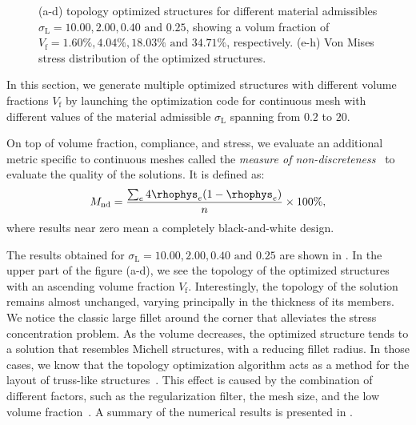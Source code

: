 \begin{figure}[]
    \hfill
    \hfill
    \caption{(a-d) topology optimized structures for different material admissibles $\sigma_\text{L}=10.00,2.00,0.40\text{ and }0.25$, showing a volum fraction of $V_\text{f}=1.60\%,4.04\%,18.03\%\text{ and }34.71\%$, respectively. (e-h) Von Mises stress distribution of the optimized structures.}
    \label{fig:03_to_sol}
\end{figure}
In this section, we generate multiple optimized structures with different volume fractions $V_\text{f}$ by launching the optimization code for continuous mesh with different values of the material admissible $\sigma_\text{L}$ spanning from $0.2$ to $20$.

On top of volume fraction, compliance, and stress, we evaluate an additional metric specific to continuous meshes called the \textit{measure of non-discreteness}~ to evaluate the quality of the solutions. It is defined as:
\begin{equation}
    M_\text{nd} = \frac{\sum_e 4 \rhophys_e(1-\rhophys_e)}{n} \times 100 \%,
\end{equation}
where results near zero mean a completely black-and-white design. 

The results obtained for $\sigma_\text{L}=10.00,2.00,0.40\text{ and }0.25$ are shown in . In the upper part of the figure (a-d), we see the topology of the optimized structures with an ascending volume fraction $V_\text{f}$. Interestingly, the topology of the solution remains almost unchanged, varying principally in the thickness of its members. We notice the classic large fillet around the corner that alleviates the stress concentration problem. As the volume decreases, the optimized structure tends to a solution that resembles Michell structures, with a reducing fillet radius. In those cases, we know that the topology optimization algorithm acts as a method for the layout of truss-like structures~. This effect is caused by the combination of different factors, such as the regularization filter, the mesh size, and the low volume fraction~. A summary of the numerical results is presented in .

